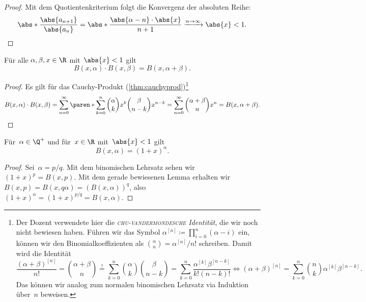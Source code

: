 \documentclass[a4paper]{article}
\begin{document}
\begin{proof}
    Mit dem Quotientenkriterium folgt die Konvergenz der absoluten Reihe:
    \begin{equation*}
        \abs*{\frac{\abs{a_{n+1}}}{\abs{a_n}}} = \abs*{\frac{\abs{\alpha-n} \cdot \abs{x}}{n+1}} \xrightarrow{n\to\infty} \abs{x} < 1. \qedhere
    \end{equation*}
\end{proof}

\begin{lemma}
    Für alle $\alpha,\beta,x \in \R$ mit~$\abs{x} < 1$ gilt
    \begin{equation*}
        B(x,\alpha) \cdot B(x,\beta) = B(x,\alpha+\beta).
    \end{equation*}
\end{lemma}

\begin{proof}
    Es gilt für das Cauchy-Produkt (\cref{thm:cauchyprod})\footnote{Der Dozent verwendete hier die \emph{\textsc{chu}-\textsc{vandermondesche} Identität}, die wir noch nicht bewiesen haben. Führen wir das Symbol $\alpha^{[n]} \coloneqq \prod_{i=0}^n (\alpha-i)$ ein, können wir den Binomialkoeffizienten als $\binom{\alpha}{n} = \alpha^{[n]}/n!$ schreiben. Damit wird die Identität
    \begin{equation*}
        \frac{(\alpha+\beta)^{[n]}}{n!}= \binom{\alpha+\beta}{n} \overset{!}{=} \sum_{k=0}^n \binom{\alpha}{k}\binom{\beta}{n-k} = \sum_{k=0}^n \frac{\alpha^{[k]} \beta^{[n-k]}}{k!(n-k)!} \iff (\alpha+\beta)^{[n]} = \sum_{k=0}^n \binom{n}{k} \alpha^{[k]} \beta^{[n-k]}.
    \end{equation*}
    Das können wir analog zum normalen binomischen Lehrsatz via Induktion über~$n$ beweisen.}
    \begin{equation*}
        B(x,\alpha) \cdot B(x,\beta) = \sum_{n=0}^\infty \paren*{\sum_{k=0}^n \binom{\alpha}{k} x^k \binom{\beta}{n-k} x^{n-k}} = \sum_{n=0}^\infty \binom{\alpha+\beta}{n} x^n = B(x,\alpha+\beta). \qedhere
    \end{equation*}
\end{proof}

\begin{theorem}
    Für~$\alpha \in \Q^+$ und für~$x \in \R$ mit~$\abs{x} < 1$ gilt
    \begin{equation*}
        B(x,\alpha) = (1+x)^\alpha.
    \end{equation*}
\end{theorem}

\begin{proof}
    Sei~$\alpha = p/q$. Mit dem binomischen Lehrsatz sehen wir $(1+x)^p = B(x,p)$. Mit dem gerade bewiesenen Lemma erhalten wir $B(x,p) = B(x,q\alpha) = (B(x,\alpha))^q$, also $(1+x)^\alpha = (1+x)^{p/q} = B(x,\alpha)$.
\end{proof}
\end{document}
